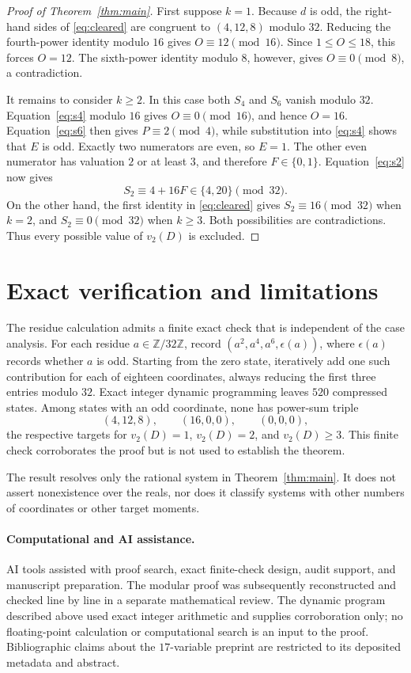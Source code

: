 \documentclass[11pt]{article}
\begin{document}
\begin{proof}[Proof of Theorem~\ref{thm:main}]
First suppose \(k=1\).  Because \(d\) is odd, the right-hand sides of
\eqref{eq:cleared} are congruent to \((4,12,8)\) modulo \(32\).  Reducing
the fourth-power identity modulo \(16\) gives
\(O\equiv12\pmod {16}\).  Since \(1\leq O\leq18\), this forces \(O=12\).
The sixth-power identity modulo \(8\), however, gives
\(O\equiv0\pmod8\), a contradiction.

It remains to consider \(k\geq2\).  In this case both \(S_4\) and \(S_6\)
vanish modulo \(32\).  Equation~\eqref{eq:s4} modulo \(16\) gives
\(O\equiv0\pmod {16}\), and hence \(O=16\).  Equation~\eqref{eq:s6}
then gives \(P\equiv2\pmod4\), while substitution into
\eqref{eq:s4} shows that \(E\) is odd.  Exactly two numerators are even,
so \(E=1\).  The other even numerator has valuation \(2\) or at least
\(3\), and therefore \(F\in\{0,1\}\).  Equation~\eqref{eq:s2} now gives
\[
 S_2\equiv4+16F\in\{4,20\}\pmod {32}.
\]
On the other hand, the first identity in \eqref{eq:cleared} gives
\(S_2\equiv16\pmod {32}\) when \(k=2\), and
\(S_2\equiv0\pmod {32}\) when \(k\geq3\).  Both possibilities are
contradictions.  Thus every possible value of \(v_2(D)\) is excluded.
\end{proof}

\section{Exact verification and limitations}

The residue calculation admits a finite exact check that is independent of
the case analysis.  For each residue \(a\in\mathbb Z/32\mathbb Z\), record
\((a^2,a^4,a^6,\epsilon(a))\), where \(\epsilon(a)\) records whether \(a\)
is odd.  Starting from the zero state, iteratively add one such contribution
for each of eighteen coordinates, always reducing the first three entries
modulo \(32\).  Exact integer dynamic programming leaves \(520\) compressed
states.  Among states with an odd coordinate, none has power-sum triple
\[
 (4,12,8),\qquad (16,0,0),\qquad (0,0,0),
\]
the respective targets for \(v_2(D)=1\), \(v_2(D)=2\), and
\(v_2(D)\geq3\).  This finite check corroborates the proof but is not used
to establish the theorem.

The result resolves only the rational system in Theorem~\ref{thm:main}.
It does not assert nonexistence over the reals, nor does it classify systems
with other numbers of coordinates or other target moments.

\paragraph{Computational and AI assistance.}
AI tools assisted with proof search, exact finite-check design, audit support,
and manuscript preparation.  The modular proof was subsequently reconstructed
and checked line by line in a separate mathematical review.  The dynamic
program described above used exact integer arithmetic and supplies corroboration
only; no floating-point calculation or computational search is an input to the
proof.  Bibliographic claims about the \(17\)-variable preprint are restricted
to its deposited metadata and abstract.



\end{document}
